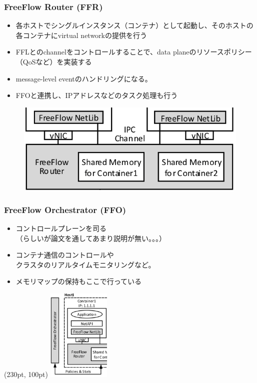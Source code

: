 \documentclass[dvipdfmx,9pt,notheorems]{beamer}
\theoremstyle{definition}
\begin{document}
\begin{frame}\frametitle{FreeFlow Router (FFR)}
	\begin{itemize}
		\item 各ホストでシングルインスタンス（コンテナ）として起動し、そのホストの各コンテナにvirtual networkの提供を行う
		\item FFLとのchannelをコントロールすることで、data planeのリソースポリシー（QoSなど）を実装する
		\item message-level eventのハンドリングになる。
		\item FFOと連携し、IPアドレスなどのタスク処理も行う
  \end{itemize}
  \begin{figure}[htb]
    \centering
    \includegraphics[scale=1]{fig/figure4-ffr.png}
  \end{figure}
\end{frame}

\begin{frame}\frametitle{FreeFlow Orchestrator (FFO)}
	\begin{itemize}
		\item コントロールプレーンを司る \\
			   （らしいが論文を通してあまり説明が無い。。。）
		\item コンテナ通信のコントロールや \\
			    クラスタのリアルタイムモニタリングなど。
		\item メモリマップの保持もここで行っている
  \end{itemize}
  \begin{textblock*}{0.4\linewidth} (230pt, 100pt)
  	\centering
  	\includegraphics[width=30mm]{fig/figure4-ffo.png}
  \end{textblock*}
\end{frame}
\end{document}
